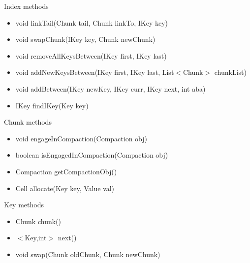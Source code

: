Index methods
\begin{itemize} 
\item void linkTail(Chunk tail, Chunk linkTo, IKey key)
\item void swapChunk(IKey key, Chunk newChunk)
\item void removeAllKeysBetween(IKey first, IKey last)
\item void addNewKeysBetween(IKey first, IKey last, List$<$Chunk$>$ chunkList)
\item void addBetween(IKey newKey, IKey curr, IKey next, int aba) 
\item IKey findIKey(Key key)
\end{itemize}

Chunk methods
\begin{itemize} 
\item void engageInCompaction(Compaction obj)
\item boolean isEngagedInCompaction(Compaction obj) 
\item Compaction getCompactionObj()
\item Cell allocate(Key key, Value val)
\end{itemize}

Key methods
\begin{itemize} 
\item Chunk chunk()
\item $<$Key,int$>$ next() 
\item void swap(Chunk oldChunk, Chunk newChunk)
\end{itemize}

